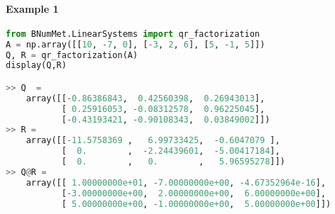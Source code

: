 \paragraph{Example 1}{
\begin{lstlisting}[language=Python]
from BNumMet.LinearSystems import qr_factorization
A = np.array([[10, -7, 0], [-3, 2, 6], [5, -1, 5]])
Q, R = qr_factorization(A)
display(Q,R)

>> Q  = 
    array([[-0.86386843,  0.42560398,  0.26943013],
           [ 0.25916053, -0.08312578,  0.96225045],
           [-0.43193421, -0.90108343,  0.03849002]])
>> R = 
    array([[-11.5758369 ,   6.99733425,  -0.6047079 ],
           [  0.        ,  -2.24439601,  -5.00417184],
           [  0.        ,   0.        ,   5.96595278]])
>> Q@R = 
    array([[ 1.00000000e+01, -7.00000000e+00, -4.67352964e-16],
           [-3.00000000e+00,  2.00000000e+00,  6.00000000e+00],
           [ 5.00000000e+00, -1.00000000e+00,  5.00000000e+00]])
\end{lstlisting}
}